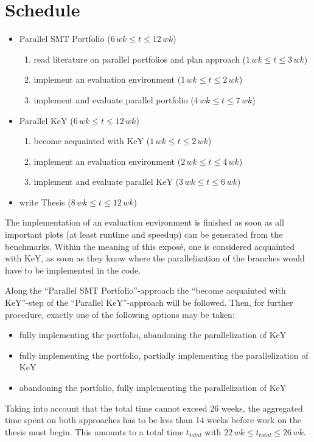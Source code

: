 \documentclass{scrartcl}
\begin{document}
\section{Schedule}
\begin{itemize}
    \item Parallel SMT Portfolio (\(6\, wk \le t \le 12\, wk\))
    \begin{enumerate}
        \item read literature on parallel portfolios and plan approach
            (\(1\, wk \le t \le 3\, wk\))
        \item implement an evaluation environment
            (\(1\, wk \le t \le 2\, wk\))
        \item implement and evaluate parallel portfolio
            (\(4\, wk \le t \le 7\, wk\))
    \end{enumerate}
    \item Parallel KeY (\(6\, wk \le t \le 12\, wk\))
    \begin{enumerate}
        \item become acquainted with KeY
            (\(1\, wk \le t \le 2\, wk\))
        \item implement an evaluation environment
            (\(2\, wk \le t \le 4\, wk\))
        \item implement and evaluate parallel KeY
            (\(3\, wk \le t \le 6\, wk\))
    \end{enumerate}
    \item write Thesis (\(8\, wk \le t \le 12\, wk\))
\end{itemize}

The implementation of an evaluation environment is finished as soon as
all important plots (at least runtime and speedup) can be generated from the benchmarks.
Within the meaning of this exposé, one is considered acquainted with KeY,
as soon as they know where the parallelization of the branches would have to be
implemented in the code.

Along the \enquote{Parallel SMT Portfolio}-approach the
\enquote{become acquainted with KeY}-step of the \enquote{Parallel KeY}-approach
will be followed.
Then, for further procedure, exactly one of the following options may be taken:
\begin{itemize}
    \item fully implementing the portfolio, abandoning the parallelization of KeY
    \item fully implementing the portfolio, partially implementing the parallelization of KeY
    \item abandoning the portfolio, fully implementing the parallelization of KeY
\end{itemize}

Taking into account that the total time cannot exceed 26 weeks,
the aggregated time spent on both approaches has to be less than 14 weeks
before work on the thesis must begin.
This amounts to a total time \(t_{total}\) with \(22\, wk \le t_{total} \le 26\, wk\).
\printbibliography
\end{document}
